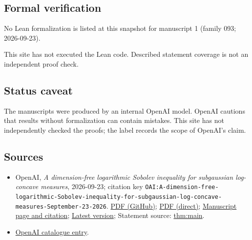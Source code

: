 \documentclass[11pt]{article}
\begin{document}
\subsection{Formal verification}
No Lean formalization is listed at this snapshot for manuscript 1 (family 093; 2026-09-23).

This site has not executed the Lean code. Described statement coverage is not an independent proof check.

\subsection{Status caveat}
The manuscripts were produced by an internal OpenAI model. OpenAI cautions that results without formalization can contain mistakes. This site has not independently checked the proofs; the label records the scope of OpenAI's claim.

\subsection{Sources}
\begin{itemize}
\item OpenAI, \emph{A dimension-free logarithmic Sobolev inequality for subgaussian log-concave measures}, 2026-09-23; citation key \texttt{OAI:A-dimension-free-logarithmic-Sobolev-inequality-for-subgaussian-log-concave-measures-September-23-2026}. \href{https://github.com/openai/math/blob/adc7f1241b42e322a6451854ab7e4b4c146bf78a/preprints/A-dimension-free-logarithmic-Sobolev-inequality-for-subgaussian-log-concave-measures-September-23-2026/paper.pdf}{PDF (GitHub)}; \href{https://github.com/openai/math/raw/adc7f1241b42e322a6451854ab7e4b4c146bf78a/preprints/A-dimension-free-logarithmic-Sobolev-inequality-for-subgaussian-log-concave-measures-September-23-2026/paper.pdf}{PDF (direct)}; \href{https://github.com/openai/math/blob/adc7f1241b42e322a6451854ab7e4b4c146bf78a/preprints/A-dimension-free-logarithmic-Sobolev-inequality-for-subgaussian-log-concave-measures-September-23-2026/README.md}{Manuscript page and citation}; \href{https://github.com/openai/math/blob/main/preprints/A-dimension-free-logarithmic-Sobolev-inequality-for-subgaussian-log-concave-measures-September-23-2026/paper.pdf}{Latest version}; Statement source: \href{https://github.com/openai/math/blob/adc7f1241b42e322a6451854ab7e4b4c146bf78a/preprints/A-dimension-free-logarithmic-Sobolev-inequality-for-subgaussian-log-concave-measures-September-23-2026/build/sections/01-introduction.tex\#L26}{thm:main}.
\item \href{https://github.com/openai/math/blob/adc7f1241b42e322a6451854ab7e4b4c146bf78a/CONTENTS.md}{OpenAI catalogue entry}.
\end{itemize}
\end{document}
